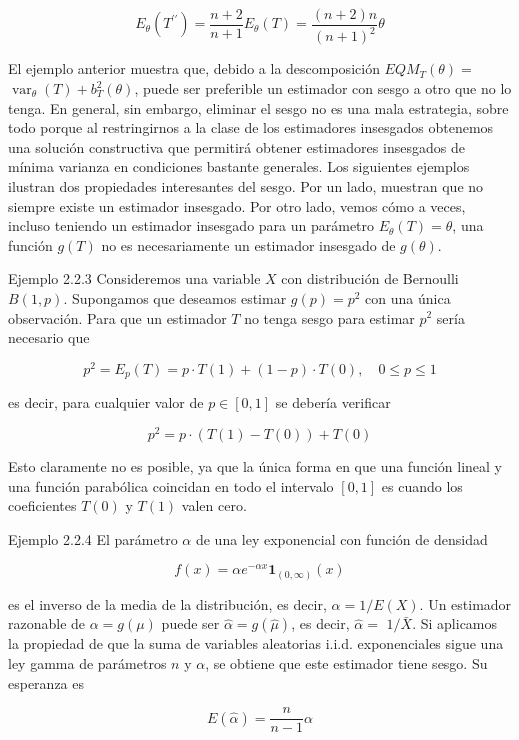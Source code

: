 \documentclass[
]{article}
\begin{document}
\[
E_{\theta}\left(T^{\prime \prime}\right)=\frac{n+2}{n+1} E_{\theta}(T)=\frac{(n+2) n}{(n+1)^{2}} \theta
\]

El ejemplo anterior muestra que, debido a la descomposición \(E Q M_{T}(\theta)=\) \(\operatorname{var}_{\theta}(T)+b_{T}^{2}(\theta)\), puede ser preferible un estimador con sesgo a otro que no lo tenga.
En general, sin embargo, eliminar el sesgo no es una mala estrategia, sobre todo porque al restringirnos a la clase de los estimadores insesgados obtenemos una solución constructiva que permitirá obtener estimadores insesgados de mínima varianza en condiciones bastante generales.
Los siguientes ejemplos ilustran dos propiedades interesantes del sesgo. Por un lado, muestran que no siempre existe un estimador insesgado. Por otro lado, vemos cómo a veces, incluso teniendo un estimador insesgado para un parámetro \(E_{\theta}(T)=\theta\), una función \(g(T)\) no es necesariamente un estimador insesgado de \(g(\theta)\).

Ejemplo 2.2.3 Consideremos una variable \(X\) con distribución de Bernoulli \(B(1, p)\). Supongamos que deseamos estimar \(g(p)=p^{2}\) con una única observación. Para que un estimador \(T\) no tenga sesgo para estimar \(p^{2}\) sería necesario que

\[
p^{2}=E_{p}(T)=p \cdot T(1)+(1-p) \cdot T(0), \quad 0 \leq p \leq 1
\]

es decir, para cualquier valor de \(p \in[0,1]\) se debería verificar

\[
p^{2}=p \cdot(T(1)-T(0))+T(0)
\]

Esto claramente no es posible, ya que la única forma en que una función lineal y una función parabólica coincidan en todo el intervalo \([0,1]\) es cuando los coeficientes \(T(0)\) y \(T(1)\) valen cero.

Ejemplo 2.2.4 El parámetro \(\alpha\) de una ley exponencial con función de densidad

\[
f(x)=\alpha e^{-\alpha x} \mathbf{1}_{(0, \infty)}(x)
\]

es el inverso de la media de la distribución, es decir, \(\alpha=1 / E(X)\).
Un estimador razonable de \(\alpha=g(\mu)\) puede ser \(\hat{\alpha}=g(\hat{\mu})\), es decir, \(\hat{\alpha}=\) \(1 / \bar{X}\). Si aplicamos la propiedad de que la suma de variables aleatorias i.i.d. exponenciales sigue una ley gamma de parámetros \(n\) y \(\alpha\), se obtiene que este estimador tiene sesgo. Su esperanza es

\[
E(\hat{\alpha})=\frac{n}{n-1} \alpha
\]
\end{document}
